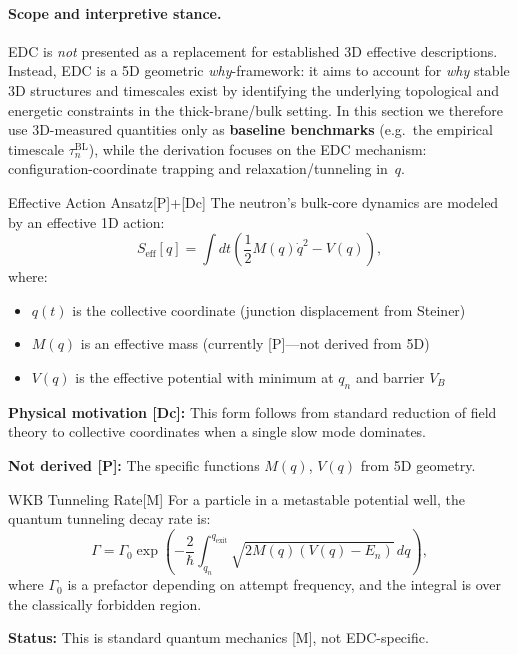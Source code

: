\paragraph{Scope and interpretive stance.}
EDC is \emph{not} presented as a replacement for established 3D effective descriptions.
Instead, EDC is a 5D geometric \emph{why}-framework: it aims to account for \emph{why}
stable 3D structures and timescales exist by identifying the underlying topological and
energetic constraints in the thick-brane/bulk setting.
In this section we therefore use 3D-measured quantities only as \textbf{baseline benchmarks}
(e.g.\ the empirical timescale $\tau_n^{\mathrm{BL}}$), while the derivation focuses on
the EDC mechanism: configuration-coordinate trapping and relaxation/tunneling in~$q$.

\begin{edcLemmaBox}{Effective Action Ansatz}{[P]+[Dc]}
\label{lem:B1_effective_action}
The neutron's bulk-core dynamics are modeled by an effective 1D action:
\begin{equation}
\label{eq:effective_action}
S_{\mathrm{eff}}[q] = \int dt \left( \frac{1}{2} M(q) \dot{q}^2 - V(q) \right),
\end{equation}
where:
\begin{itemize}[nosep]
  \item $q(t)$ is the collective coordinate (junction displacement from Steiner)
  \item $M(q)$ is an effective mass (currently [P]---not derived from 5D)
  \item $V(q)$ is the effective potential with minimum at $q_n$ and barrier $V_B$
\end{itemize}

\textbf{Physical motivation [Dc]:} This form follows from standard reduction of
field theory to collective coordinates when a single slow mode dominates.

\textbf{Not derived [P]:} The specific functions $M(q)$, $V(q)$ from 5D geometry.
\end{edcLemmaBox}

\begin{edcLemmaBox}{WKB Tunneling Rate}{[M]}
\label{lem:B2_wkb}
For a particle in a metastable potential well, the quantum tunneling decay rate is:
\begin{equation}
\label{eq:wkb_rate}
\Gamma = \Gamma_0 \exp\left( -\frac{2}{\hbar} \int_{q_n}^{q_{\mathrm{exit}}}
         \sqrt{2M(q)(V(q) - E_n)} \, dq \right),
\end{equation}
where $\Gamma_0$ is a prefactor depending on attempt frequency, and the integral
is over the classically forbidden region.

\textbf{Status:} This is standard quantum mechanics [M], not EDC-specific.
\end{edcLemmaBox}

